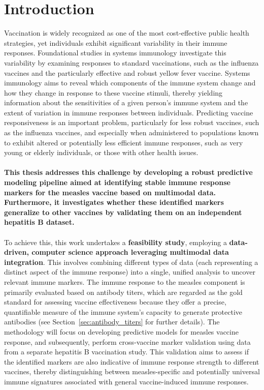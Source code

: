 \documentclass[12pt,a4paper]{report}
\begin{document}
\chapter{Introduction}
\setcounter{page}{1}
Vaccination is widely recognized as one of the most cost‑effective public health strategies, yet individuals exhibit significant variability in their immune responses. Foundational studies in systems immunology \cite{brodin2017human, castrucci2018factors} investigate this variability by examining responses to standard vaccinations, such as the influenza vaccines and the particularly effective and robust yellow fever vaccine. Systems immunology aims to reveal which components of the immune system change and how they change in response to these vaccine stimuli, thereby yielding information about the sensitivities of a given person’s immune system and the extent of variation in immune responses between individuals. Predicting vaccine responsiveness is an important problem, particularly for less robust vaccines, such as the influenza vaccines, and especially when administered to populations known to exhibit altered or potentially less efficient immune responses, such as very young or elderly individuals, or those with other health issues.\\
\\
\textbf{This thesis addresses this challenge by developing a robust predictive modeling pipeline aimed at identifying stable immune response markers for the measles vaccine based on multimodal data. Furthermore, it investigates whether these identified markers generalize to other vaccines by validating them on an independent hepatitis B dataset.}\\
\\
To achieve this, this work undertakes a \textbf{feasibility study}, employing a \textbf{data-driven, computer science approach leveraging multimodal data integration}. This involves combining different types of data (each representing a distinct aspect of the immune response) into a single, unified analysis to uncover relevant immune markers. The immune response to the measles component is primarily evaluated based on antibody titers, which are regarded as the gold standard for assessing vaccine effectiveness because they offer a precise, quantifiable measure of the immune system’s capacity to generate protective antibodies \cite{plotkin2010correlates} (see Section~\ref{sec:antibody_titers} for further details). The methodology will focus on developing predictive models for measles vaccine response, and subsequently, perform cross-vaccine marker validation using data from a separate hepatitis B vaccination study. This validation aims to assess if the identified markers are also indicative of immune response strength to different vaccines, thereby distinguishing between measles-specific and potentially universal immune signatures associated with general vaccine-induced immune responses.\\
\end{document}
